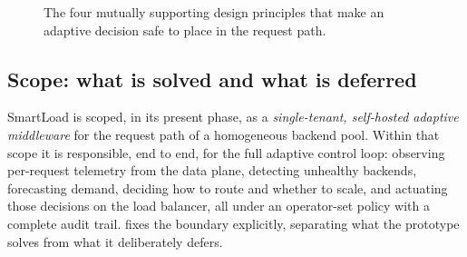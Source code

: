 \begin{figure}[H]
\centering
{}
\caption[Four design principles for a safe adaptive path]{The four mutually supporting design principles that make an adaptive decision safe to place in the request path.}
\label{dsa:fig:principles}
\end{figure}

\subsection{Scope: what is solved and what is deferred}
\label{dsa:sec:problem-scope}

SmartLoad is scoped, in its present phase, as a \emph{single-tenant, self-hosted
adaptive middleware} for the request path of a homogeneous backend pool. Within
that scope it is responsible, end to end, for the full adaptive control loop:
observing per-request telemetry from the data plane, detecting unhealthy backends,
forecasting demand, deciding how to route and whether to scale, and actuating those
decisions on the load balancer, all under an operator-set policy with a complete
audit trail.  fixes the boundary explicitly, separating what
the prototype solves from what it deliberately defers.

